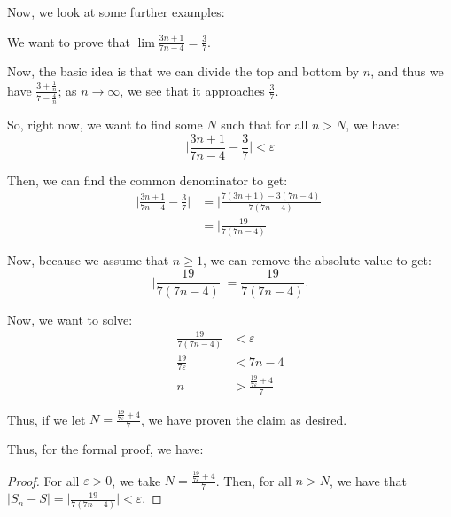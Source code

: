 \documentclass[openany]{book}
\begin{document}
Now, we look at some further examples:
\begin{example}
	We want to prove that $\lim \frac{3n+1}{7n-4} = \frac{3}{7}$.
	
	Now, the basic idea is that we can divide the top and bottom by $n$, and thus we have $\frac{3 + \frac{1}{n}}{7 - \frac{4}{n}}$; as $n \rightarrow \infty$, we see that it approaches $\frac{3}{7}$.
	
	So, right now, we want to find some $N$ such that for all $n > N$, we have:
	\begin{equation*}
		\lvert \frac{3n+1}{7n-4} - \frac{3}{7} \rvert < \varepsilon
	\end{equation*}
	
	Then, we can find the common denominator to get:
	\begin{align*}
		\lvert \frac{3n+1}{7n-4} - \frac{3}{7} \rvert &= \lvert \frac{7(3n+1) - 3(7n-4)}{7(7n-4)} \rvert \\
		&= \lvert \frac{19}{7(7n-4)} \rvert
	\end{align*}
	
	Now, because we assume that $n \geq 1$, we can remove the absolute value to get:
	\begin{equation*}
		\lvert \frac{19}{7(7n-4)} \rvert = \frac{19}{7(7n-4)}.
	\end{equation*}
	
	Now, we want to solve:
	\begin{align*}
		\frac{19}{7(7n-4)} &< \varepsilon \\
		\frac{19}{7\varepsilon} &< 7n-4 \\
		n &> \frac{\frac{19}{7\varepsilon} + 4}{7}
	\end{align*}
	
	Thus, if we let $N = \frac{\frac{19}{7\varepsilon} + 4}{7}$, we have proven the claim as desired.
	
	Thus, for the formal proof, we have:
	\begin{proof}
		For all $\varepsilon > 0$, we take $N = \frac{\frac{19}{7\varepsilon} + 4}{7}$. Then, for all $n > N$, we have that $\lvert S_n - S \rvert = \lvert \frac{19}{7(7n-4)} \rvert < \varepsilon$.
	\end{proof}
\end{example}
\end{document}
